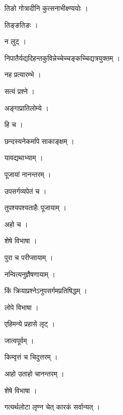 \documentclass[10pt, openany]{book}
\begin{document}
\noindent तिङो गोत्रादीनि कुत्सनाभीक्ष्ण्ययोः ।

\noindent तिङ्ङतिङः ।

\noindent न लुट् ।

\noindent निपातैर्यद्यदिहन्तकुविन्नेच्चेच्चङ्कच्चिद्यत्रयुक्तम् ।

\noindent नह प्रत्यारम्भे ।

\noindent सत्यं प्रश्ने ।

\noindent अङ्गाप्रातिलोम्ये ।

\noindent हि च ।

\noindent छन्दस्यनेकमपि साकाङ्क्षम् ।

\noindent यावद्यथाभ्याम् ।

\noindent पूजायां नानन्तरम् ।

\noindent उपसर्गव्यपेतं च ।

\noindent तुपश्यपश्यताहैः पूजायाम् ।

\noindent अहो च ।

\noindent शेषे विभाषा ।

\noindent पुरा च परीप्सायाम् ।

\noindent नन्वित्यनुज्ञैषणायाम् ।

\noindent किं क्रियाप्रश्नेऽनुपसर्गमप्रतिषिद्धम् ।

\noindent लोपे विभाषा ।

\noindent एहिमन्ये प्रहासे लृट् ।

\noindent जात्वपूर्वम् ।

\noindent किम्वृत्तं च चिदुत्तरम् ।

\noindent आहो उताहो चानन्तरम् ।

\noindent शेषे विभाषा ।

\noindent गत्यर्थलोटा लृण्न चेत् कारकं सर्वान्यत् ।
\end{document}
